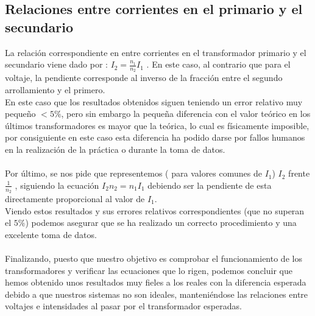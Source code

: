 \documentclass[11pt,letterpaper,twocolumn]{article}
\begin{document}
\subsection{Relaciones entre corrientes en el primario y el secundario}
La relación correspondiente en entre corrientes en el transformador primario y el secundario viene dado por : $I_2=\frac{n_1}{n_2}I_1$ . En este caso, al contrario que para el voltaje, la pendiente corresponde al inverso de la fracción entre el segundo arrollamiento y el primero.\\
En este caso que los resultados obtenidos siguen teniendo un error relativo muy pequeño $<5\%$, pero sin embargo la pequeña diferencia con el valor teórico en los últimos transformadores es mayor que la teórica, lo cual es físicamente imposible, por consiguiente en este caso esta diferencia ha podido darse por fallos humanos en la realización de la práctica o durante la toma de datos. \\
\\
 Por último, se nos pide que representemos ( para valores comunes de $I_1$) $I_2$ frente $\frac{1}{n_2}$ , siguiendo la ecuación $I_2n_2=n_1I_1$ debiendo ser la pendiente de esta directamente proporcional al valor de $I_1$.\\
 Viendo estos resultados y sus errores relativos correspondientes (que no superan el $5\%$) podemos asegurar que se ha realizado un correcto procedimiento y una excelente toma de datos.\\
 \\
 Finalizando, puesto que nuestro objetivo es comprobar el funcionamiento de los transformadores y verificar las ecuaciones que lo rigen, podemos concluir que hemos obtenido unos resultados muy fieles a los reales con la diferencia esperada debido a que nuestros sistemas no son ideales, manteniéndose las relaciones entre voltajes e intensidades al pasar por el transformador esperadas. 
\end{document}
